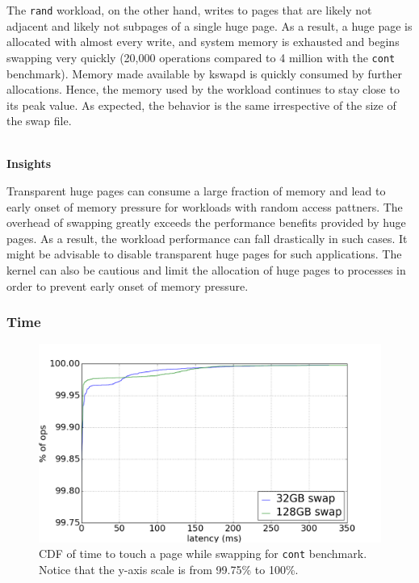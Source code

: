 \documentclass[twocolumn,11pt]{article}
\begin{document}
The \texttt{rand} workload, on the other hand, writes to pages that are likely not
adjacent and likely not subpages of a single huge page. As a result, a huge page
is allocated with almost every write, and system memory is exhausted and begins
swapping very quickly (20,000 operations compared to 4 million with the \texttt{cont} benchmark). Memory made available by kswapd is quickly consumed by
further allocations. Hence, the memory used by the workload continues to stay
close to its peak value. As expected, the behavior is the same irrespective of
the size of the swap file.


~\\ \textbf{Insights} 

Transparent huge pages can consume a large fraction of memory and lead to early
onset of memory pressure for workloads with random access pattners. The overhead of swapping greatly exceeds the
performance benefits provided by huge pages. As a result, the workload
performance can fall drastically in such cases. It might be advisable to
disable transparent huge pages for such applications. The kernel can also be
cautious and limit the allocation of huge pages to processes in order to
prevent early onset of memory pressure.

\subsubsection{Time}

\begin{figure}[t]
    \includegraphics[width=\columnwidth]{figures/swap_touch_time_cont_cdf}
    \caption{CDF of time to touch a page while swapping for \texttt{cont}
    benchmark. Notice that the y-axis scale is from 99.75\% to 100\%.
    \label{fig:swap_time_cont_cdf}}
\end{figure}
\end{document}
